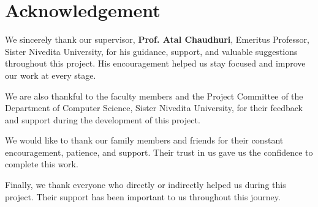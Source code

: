 \chapter{Acknowledgement}
\vspace{-0.5cm}
\singlespacing
We sincerely thank our supervisor, \textbf{Prof. Atal Chaudhuri}, Emeritus Professor, Sister Nivedita University, for his guidance, support, and valuable suggestions throughout this project. His encouragement helped us stay focused and improve our work at every stage.\par

We are also thankful to the faculty members and the Project Committee of the Department of Computer Science, Sister Nivedita University, for their feedback and support during the development of this project.\par

We would like to thank our family members and friends for their constant encouragement, patience, and support. Their trust in us gave us the confidence to complete this work.\par

Finally, we thank everyone who directly or indirectly helped us during this project. Their support has been important to us throughout this journey.





